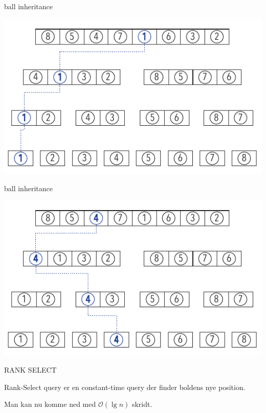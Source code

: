 \documentclass[pdf]{beamer}
\begin{document}
\begin{frame}{ball inheritance}
  \begin{center}
    \includegraphics[scale=1.0]{pictures/bolde_1.pdf}
  \end{center}
\end{frame}

\begin{frame}{ball inheritance}
  \begin{center}
    \includegraphics[scale=1.0]{pictures/bolde_4.pdf}
  \end{center}
\end{frame}


\begin{frame}{RANK SELECT}

  Rank-Select query er en constant-time query der finder boldens nye position.

  Man kan nu komme ned med $\mathcal{O}(\lg n)$ skridt. 
\end{frame}
\end{document}
